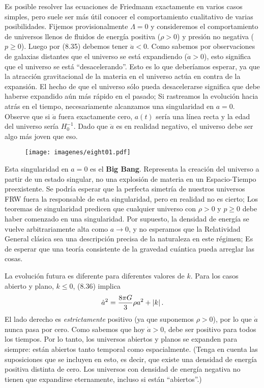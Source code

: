 \documentclass[11pt,b5paper,openany,twoside]{book}
\begin{document}
Es posible resolver las ecuaciones de Friedmann exactamente en varios casos simples, pero suele ser más útil conocer el comportamiento cualitativo de varias posibilidades.
Fijemos provisionalmente $\Lambda=0$ y consideremos el comportamiento de universos llenos de fluidos de energía positiva ($\rho > 0$) y presión no negativa ($p\geq 0$).
Luego por (8.35) debemos tener $\ddot a<0$.
Como sabemos por observaciones de galaxias distantes que el universo se está expandiendo ($\dot a>0$), esto significa que el universo se está ``desacelerando''.
Esto es lo que deberíamos esperar, ya que la atracción gravitacional de la materia en el universo actúa en contra de la expansión.
El hecho de que el universo sólo pueda desacelerarse significa que debe haberse expandido aún más rápido en el pasado; Si rastreamos la evolución hacia atrás en el tiempo, necesariamente alcanzamos una singularidad en $a=0$.
Observe que si $\ddot a$ fuera exactamente cero, $a(t)$ sería una línea recta y la edad del universo sería $H_0^{-1}$.
Dado que $\ddot a$ es en realidad negativo, el universo debe ser algo más joven que eso.

\begin{figure}[h]
\centering
\texttt{[image: imagenes/eight01.pdf]}
\end{figure}

Esta singularidad en $a=0$ es el {\bf Big Bang}.
Representa la creación del universo a partir de un estado singular, no una explosión de materia en un Espacio-Tiempo preexistente.
Se podría esperar que la perfecta simetría de nuestros universos FRW fuera la responsable de esta singularidad, pero en realidad no es cierto; Los teoremas de singularidad predicen que cualquier universo con $\rho>0$ y $p\geq 0$ debe haber comenzado en una singularidad.
Por supuesto, la densidad de energía se vuelve arbitrariamente alta como $a\rightarrow 0$, y no esperamos que la Relatividad General clásica sea una descripción precisa de la naturaleza en este régimen; Es de esperar que una teoría consistente de la gravedad cuántica pueda arreglar las cosas.

La evolución futura es diferente para diferentes valores de $k$.
Para los casos abierto y plano, $k\leq 0$, (8.36) implica
\begin{equation}
\dot a^2 = {{8\pi G}\over 3}\rho a^2 + |k|\,.\label{8.42}
\end{equation}
El lado derecho es {\it estrictamente} positivo (ya que suponemos $\rho>0$), por lo que $\dot a$ nunca pasa por cero.
Como sabemos que hoy $\dot a>0$, debe ser positivo para todos los tiempos.
Por lo tanto, los universos abiertos y planos se expanden para siempre: están abiertos tanto temporal como espacialmente.
(Tenga en cuenta las suposiciones que se incluyen en esto, es decir, que existe una densidad de energía positiva distinta de cero.
Los universos con densidad de energía negativa no tienen que expandirse eternamente, incluso si están ``abiertos''.)
\end{document}

